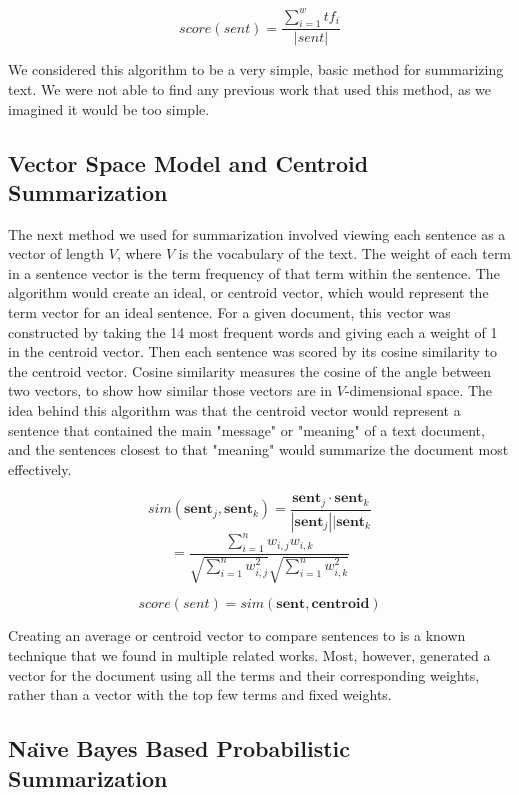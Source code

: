 \documentclass[11pt,a4paper]{article}
\begin{document}
  $$score(sent) = \frac{\sum_{i = 1}^{w} tf_i}{|sent|}$$

  We considered this algorithm to be a very simple, basic method for summarizing text. We were not able to find any previous work that used this method, as we imagined it would be too simple.

  \subsection{Vector Space Model and Centroid Summarization}

  The next method we used for summarization involved viewing each sentence as a vector of length $V$, where $V$ is the vocabulary of the text. The weight of each term in a sentence vector is the term frequency of that term within the sentence. The algorithm would create an ideal, or centroid vector, which would represent the term vector for an ideal sentence. For a given document, this vector was constructed by taking the 14 most frequent words and giving each a weight of 1 in the centroid vector. Then each sentence was scored by its cosine similarity to the centroid vector. Cosine similarity measures the cosine of the angle between two vectors, to show how similar those vectors are in $V$-dimensional space. The idea behind this algorithm was that the centroid vector would represent a sentence that contained the main "message" or "meaning" of a text document, and the sentences closest to that "meaning" would summarize the document most effectively.

  $$sim(\textbf{sent}_j, \textbf{sent}_k) = \frac{\textbf{sent}_j \cdot \textbf{sent}_k}{|\textbf{sent}_j||\textbf{sent}_k}$$
  $$= \frac{\sum_{i=1}^{n}w_{i,j}w_{i,k}}{\sqrt{\sum_{i=1}^{n}w_{i,j}^2}\sqrt{\sum_{i=1}^{n}w_{i,k}^2}}$$

  $$score(sent) = sim(\textbf{sent}, \textbf{centroid})$$

  \cite{DHM:99}
  Creating an average or centroid vector to compare sentences to is a known technique that we found in multiple related works. Most, however, generated a vector for the document using all the terms and their corresponding weights, rather than a vector with the top few terms and fixed weights.

  \subsection{Na{\"\i}ve Bayes Based Probabilistic Summarization}
\end{document}
